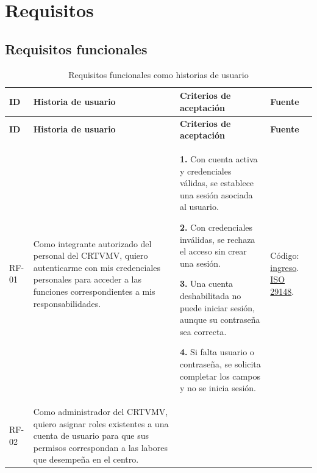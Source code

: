 \documentclass[11pt,a4paper]{article}
\begin{document}
	\section{Requisitos}
	
	\subsection{Requisitos funcionales}
	
	\begin{xltabular}{\textwidth}{lL{4.2cm}XL{2cm}}
		\caption{Requisitos funcionales como historias de usuario}\label{tab:rf}\\
		\toprule
		\textbf{ID} & \textbf{Historia de usuario} & \textbf{Criterios de aceptación} & \textbf{Fuente} \\
		\midrule
		\endfirsthead
		\toprule
		\textbf{ID} & \textbf{Historia de usuario} & \textbf{Criterios de aceptación} & \textbf{Fuente} \\
		\midrule
		\endhead
		\bottomrule
		\endfoot
		RF-01 & Como integrante autorizado del personal del CRTVMV, quiero autenticarme con mis credenciales personales para acceder a las funciones correspondientes a mis responsabilidades. &
		\textbf{1.} Con cuenta activa y credenciales válidas, se establece una sesión asociada al usuario.\par
		\textbf{2.} Con credenciales inválidas, se rechaza el acceso sin crear una sesión.\par
		\textbf{3.} Una cuenta deshabilitada no puede iniciar sesión, aunque su contraseña sea correcta.\par
		\textbf{4.} Si falta usuario o contraseña, se solicita completar los campos y no se inicia sesión. &
		Código: \href{https://github.com/NixonPiguave/AppWebRevisionVehicular/blob/77d1ff6c38488fc02ab431472621ff4edb59f576/backend/src/main/java/com/revisionvehicular/backend/controllers/AuthController.java}{ingreso}. \href{https://github.com/NixonPiguave/TA-PFC-E1-PFC-Entrega-1/blob/be245df8f15b1183f94bada0679adc18146016cd/docs/Anexos/Estado\%20del\%20arte/ISO-IEC-IEEE\%2029148.pdf\#page=74}{ISO 29148}. \\
		RF-02 & Como administrador del CRTVMV, quiero asignar roles existentes a una cuenta de usuario para que sus permisos correspondan a las labores que desempeña en el centro. &

\end{xltabular}
\end{document}
